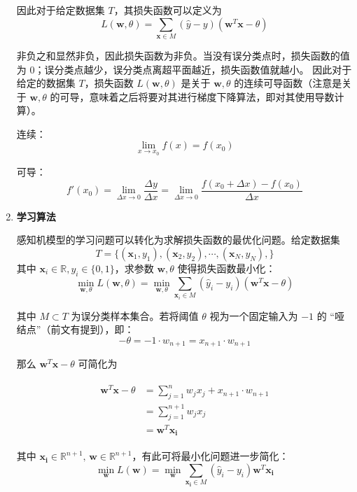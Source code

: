 \documentclass[../studies-ml.tex]{subfiles}
\begin{document}
\begin{enumerate}[I]
        因此对于给定数据集 $T$，其损失函数可以定义为
        \[ L(\pmb{w}, \theta) = \sum_{\pmb{x} \in M} (\hat{y} - y)(\pmb{w}^T \pmb{x} - \theta) \]

        非负之和显然非负，因此损失函数为非负。当没有误分类点时，损失函数的值为 $0$；误分类点越少，误分类点离超平面越近，损失函数值就越小。
        因此对于给定的数据集 $T$，损失函数 $L(\pmb{w}, \theta)$ 是关于 $\pmb{w}, \theta$ 的连续可导函数（注意是关于 $\pmb{w}, \theta$
        的可导，意味着之后将要对其进行梯度下降算法，即对其使用导数计算）。

        连续：
        \[
          \lim_{x \to x_0} f(x) = f(x_0)
        \]

        可导：
        \[
          f'(x_0) = \lim_{\Delta x \to 0} \frac{\Delta y}{\Delta x} =
          \lim_{\Delta x \to 0} \frac{f(x_0 + \Delta x) - f(x_0)}{\Delta x}
        \]

  \item \textbf{学习算法}

        感知机模型的学习问题可以转化为求解损失函数的最优化问题。给定数据集
        \[ T = \{(\pmb{x}_1,y_1),(\pmb{x}_2,y_2),\cdots,(\pmb{x}_N,y_N),\} \]
        其中 $\pmb{x}_i \in \mathbb{R}, y_i \in \{0,1\}$，求参数 $\pmb{w}, \theta$ 使得损失函数最小化：
        \[
          \min_{\pmb{w},\theta} L(\pmb{w},\theta) =
          \min_{\pmb{w},\theta} \sum_{\pmb{x}_i \in M} (\hat{y}_i - y_i)(\pmb{w}^T \pmb{x} - \theta)
        \]

        其中 $M \subset T$ 为误分类样本集合。若将阈值 $\theta$ 视为一个固定输入为 $-1$ 的 “哑结点”（前文有提到），即：
        \[ -\theta = -1 \cdot w_{n+1} = x_{n+1} \cdot w_{n+1} \]

        那么 $\pmb{w}^T \pmb{x} - \theta$ 可简化为

        \begin{align*}
          \begin{split}
            \pmb{w}^T \pmb{x} - \theta & = \sum_{j=1}^{n} w_j x_j + x_{n+1} \cdot w_{n+1} \\
            &= \sum_{j=1}^{n+1} w_j x_j \\
            &= \pmb{w}^T \pmb{x_i}
          \end{split}
        \end{align*}

        其中 $\pmb{x_i} \in \mathbb{R}^{n+1},\, \pmb{w} \in \mathbb{R}^{n+1}$，有此可将最小化问题进一步简化：
        \[
          \min_{\pmb{w}} L(\pmb{w}) = \min_{\pmb{w}} \sum_{\pmb{x_i} \in M} (\hat{y}_i - y_i) \pmb{w}^T \pmb{x_i}
        \]


\end{enumerate}
\end{document}
